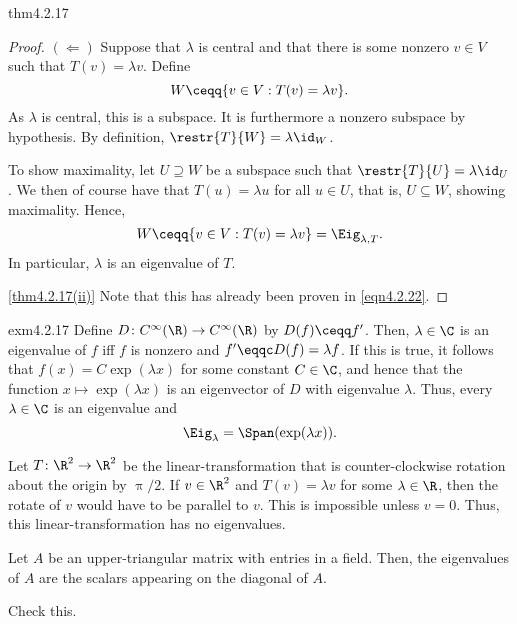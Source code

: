 \begin{thm}{}{thm4.2.17}
\begin{proof}
		\blni
		$(\Leftarrow )$ Suppose that $\lambda$ is central and that there is some nonzero $v\in V$ such that $T(v)=\lambda v$.  Define
		\begin{equation}
			W\ceqq \{ v\in V:T(v)=\lambda v\} .
		\end{equation}
		As $\lambda$ is central, this is a subspace.  It is furthermore a nonzero subspace by hypothesis.  By definition, $\restr{T}{W}=\lambda \id _W$.
		
		To show maximality, let $U\supseteq W$ be a subspace such that $\restr{T}{U}=\lambda \id _U$.  We then of course have that $T(u)=\lambda u$ for all $u\in U$, that is, $U\subseteq W$, showing maximality.  Hence,
		\begin{equation}\label{eqn4.2.22}
			W\ceqq \{ v\in V:T(v)=\lambda v\} =\Eig _{\lambda ,T}.
		\end{equation}
		In particular, $\lambda$ is an eigenvalue of $T$.
		
		\blni
		\cref{thm4.2.17(ii)} Note that this has already been proven in \eqref{eqn4.2.22}.
	\end{proof}
\end{thm}

\begin{exm}{}{exm4.2.17}
	Define $D\colon C^{\infty}(\R )\rightarrow C^{\infty}(\R )$ by $D(f)\ceqq f'$.  Then, $\lambda \in \C$ is an eigenvalue of $f$ iff $f$ is nonzero and $f'\eqqc D(f)=\lambda f$.  If this is true, it follows that $f(x)=C\exp (\lambda x)$ for some constant $C\in \C$, and hence that the function $x\mapsto \exp (\lambda x)$ is an eigenvector of $D$ with eigenvalue $\lambda$.  Thus, every $\lambda \in \C$ is an eigenvalue and
	\begin{equation}
		\Eig _{\lambda}=\Span (\exp (\lambda x)).
	\end{equation}
\end{exm}
\begin{exm}{}{}
	Let $T\colon \R ^2\rightarrow \R ^2$ be the linear-transformation that is counter-clockwise rotation about the origin by $\uppi /2$.  If $v\in \R ^2$ and $T(v)=\lambda v$ for some $\lambda \in \R$, then the rotate of $v$ would have to be parallel to $v$.  This is impossible unless $v=0$.  Thus, this linear-transformation has no eigenvalues.
\end{exm}
\begin{exm}{}{}
	Let $A$ be an upper-triangular matrix with entries in a field.  Then, the eigenvalues of $A$ are the scalars appearing on the diagonal of $A$.
	\begin{exr}[breakable=false]{}{}
		Check this.
	\end{exr}
\end{exm}

